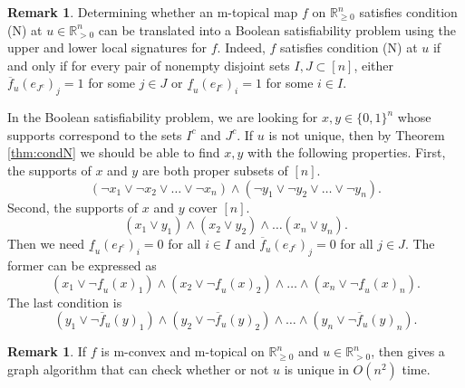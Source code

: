 \documentclass[10pt,reqno]{amsart}
\newcommand{\R}{\mathbb{R}}
\theoremstyle{plain}
\theoremstyle{definition}
\newtheorem{remark}[theorem]{Remark}
\numberwithin{equation}{section}
\begin{document}
\begin{remark}
Determining whether an m-topical map $f$ on $\R^n_{\ge 0}$ satisfies condition (N) at $u \in \R^n_{>0}$ can be translated into a Boolean satisfiability problem using the upper and lower local signatures for $f$.  Indeed, $f$ satisfies condition (N) at $u$ if and only if 
for every pair of nonempty disjoint sets $I, J \subset [n]$, either $\overline{f}_u(e_{J^c})_j = 1$ for some $j \in J$ or $\underline{f}_u(e_{I^c})_i = 1$ for some $i \in I$. 

In the Boolean satisfiability problem, we are looking for $x, y \in \{0,1\}^n$ whose supports correspond to the sets $I^c$ and $J^c$.  If $u$ is not unique, then by Theorem \ref{thm:condN} we should be able to find $x, y$ with the following properties.  
First, the supports of $x$ and $y$ are both proper subsets of $[n]$. 
$$(\neg x_1 \vee \neg x_2 \vee \ldots \vee \neg x_n) \wedge (\neg y_1 \vee \neg y_2 \vee \ldots \vee \neg y_n).$$
Second, the supports of $x$ and $y$ cover $[n]$.
$$(x_1 \vee y_1) \wedge (x_2 \vee y_2) \wedge \ldots (x_n \vee y_n).$$
Then we need $\underline{f}_u(e_{I^c})_i = 0$ for all $i \in I$ and $\overline{f}_u(e_{J^c})_j = 0$ for all $j \in J$. The former can be expressed as 
$$(x_1 \vee \neg \underline{f}_u(x)_1) \wedge (x_2 \vee \neg \underline{f}_u(x)_2) \wedge \ldots \wedge (x_n \vee \neg \underline{f}_u(x)_n).$$
The last condition is 
$$(y_1 \vee \neg \overline{f}_u(y)_1) \wedge (y_2 \vee \neg \overline{f}_u(y)_2) \wedge \ldots \wedge (y_n \vee \neg \overline{f}_u(y)_n).$$
\end{remark} 


\begin{remark}
If $f$ is m-convex and m-topical on $\R^n_{\ge 0}$ and $u \in \R^n_{>0}$, then \cite[Corollary 4.9]{AkianGaubertHochart20} gives a graph algorithm that can check whether or not $u$ is unique in $O(n^2)$ time.  
\end{remark}





\end{document}
